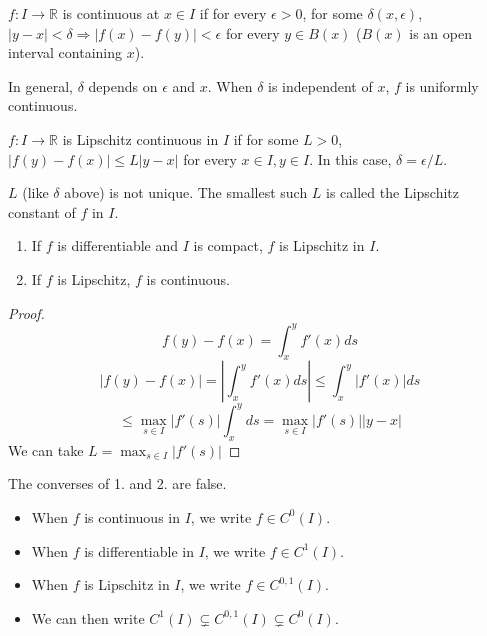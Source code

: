 \begin{definition}
	$f: I \rightarrow \mathbb{R}$ is continuous at $x \in I$ if for every $\epsilon > 0$, for some $\delta(x, \epsilon)$, $|y - x| < \delta \Rightarrow |f(x) - f(y)| < \epsilon$ for every $y \in B(x)$ ($B(x)$ is an open interval containing $x$).
\end{definition}

\begin{remark}
	In general, $\delta$ depends on $\epsilon$ and $x$. When $\delta$ is independent of $x$, $f$ is uniformly continuous.
\end{remark}

\begin{definition}
	$f: I \rightarrow \mathbb{R}$ is Lipschitz continuous in $I$ if for some $L > 0$, $|f(y) - f(x)| \le L|y - x|$ for every $x \in I, y \in I$. In this case, $\delta = \epsilon / L$.
\end{definition}

\begin{remark}
	$L$ (like $\delta$ above) is not unique. The smallest such $L$ is called the Lipschitz constant of $f$ in $I$.
\end{remark}

\begin{lemma}
	\hfill
	\begin{enumerate}
		\item If $f$ is differentiable and $I$ is compact, $f$ is Lipschitz in $I$.
		\item If $f$ is Lipschitz, $f$ is continuous.
	\end{enumerate}
\end{lemma}

\begin{proof}
	\[f(y) - f(x) = \int_x^y f'(x) ds\]
	\[|f(y) - f(x)| = |\int_x^y f'(x) ds| \le \int_x^y |f'(x)| ds\]
	\[\le \max_{s \in I} |f'(s)| \int_x^y ds = \max_{s \in I} |f'(s)| |y - x|\]
	We can take $L = \max_{s \in I} |f'(s)|$
\end{proof}

\begin{remark}
	The converses of 1. and 2. are false.
\end{remark}

\begin{remark}
	\begin{itemize}
		\item When $f$ is continuous in $I$, we write $f \in C^0 (I)$.
		\item When $f$ is differentiable in $I$, we write $f \in C^1 (I)$.
		\item When $f$ is Lipschitz in $I$, we write $f \in C^{0, 1} (I)$.
		\item We can then write $C^1 (I) \subsetneq C^{0, 1} (I) \subsetneq C^0 (I)$.
	\end{itemize}
\end{remark}


